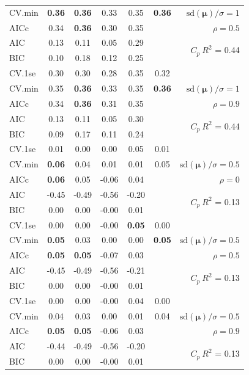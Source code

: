 \documentclass[12pt]{article}
\newcommand{\mr}[1]{\mathrm{#1}}
\newcommand{\bm}[1]{\mathbf{#1}}
\begin{document}
\begin{table}[p]
\begin{center}
\begin{tabular}{l*{5}{c}|r}
CV.min & {\bf 0.36} & {\bf 0.36} & 0.33 & 0.35 & {\bf 0.36} &  $\mr{sd}(\bm{\mu})/\sigma=1$ \\
AICc & 0.34 & {\bf 0.36} & 0.30 & 0.35 & & $\rho=0.5$ \\
AIC & 0.13 & 0.11 & 0.05 & 0.29 & & \multirow{2}{*}{$C_p ~ R^2$ = 0.44} \\
BIC & 0.10 & 0.18 & 0.12 & 0.25 & & \\
 \hline 
CV.1se & 0.30 & 0.30 & 0.28 & 0.35 & 0.32 &\\
CV.min & 0.35 & {\bf 0.36} & 0.33 & 0.35 & {\bf 0.36} &  $\mr{sd}(\bm{\mu})/\sigma=1$ \\
AICc & 0.34 & {\bf 0.36} & 0.31 & 0.35 & & $\rho=0.9$ \\
AIC & 0.13 & 0.11 & 0.05 & 0.30 & & \multirow{2}{*}{$C_p ~ R^2$ = 0.44} \\
BIC & 0.09 & 0.17 & 0.11 & 0.24 & & \\
 \hline 
CV.1se & 0.01 & 0.00 & 0.00 & 0.05 & 0.01 &\\
CV.min & {\bf 0.06} & 0.04 & 0.01 & 0.01 & 0.05 &  $\mr{sd}(\bm{\mu})/\sigma=0.5$ \\
AICc & {\bf 0.06} & 0.05 & -0.06 & 0.04 & & $\rho=0$ \\
AIC & -0.45 & -0.49 & -0.56 & -0.20 & & \multirow{2}{*}{$C_p ~ R^2$ = 0.13} \\
BIC & 0.00 & 0.00 & -0.00 & 0.01 & & \\
 \hline 
CV.1se & 0.00 & 0.00 & -0.00 & {\bf 0.05} & 0.00 &\\
CV.min & {\bf 0.05} & 0.03 & 0.00 & 0.00 & {\bf 0.05} &  $\mr{sd}(\bm{\mu})/\sigma=0.5$ \\
AICc & {\bf 0.05} & {\bf 0.05} & -0.07 & 0.03 & & $\rho=0.5$ \\
AIC & -0.45 & -0.49 & -0.56 & -0.21 & & \multirow{2}{*}{$C_p ~ R^2$ = 0.13} \\
BIC & 0.00 & 0.00 & -0.00 & 0.01 & & \\
 \hline 
CV.1se & 0.00 & 0.00 & -0.00 & 0.04 & 0.00 &\\
CV.min & 0.04 & 0.03 & 0.00 & 0.01 & 0.04 &  $\mr{sd}(\bm{\mu})/\sigma=0.5$ \\
AICc & {\bf 0.05} & {\bf 0.05} & -0.06 & 0.03 & & $\rho=0.9$ \\
AIC & -0.44 & -0.49 & -0.56 & -0.20 & & \multirow{2}{*}{$C_p ~ R^2$ = 0.13} \\
BIC & 0.00 & 0.00 & -0.00 & 0.01 & & \\
 \hline 
\end{tabular}
\end{center}
\vspace{-1cm}
\end{table}
\end{document}
